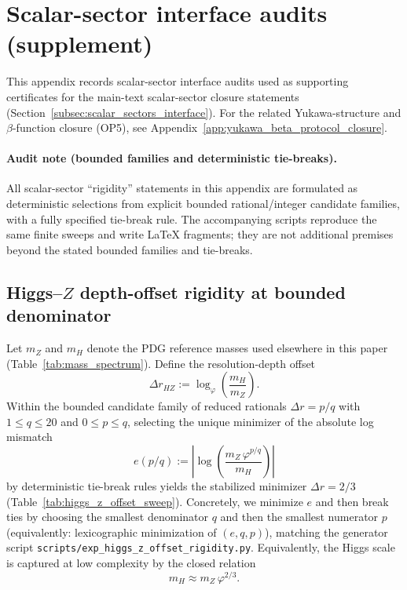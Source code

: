 \section{Scalar-sector interface audits (supplement)}
\label{app:scalar_interface_audits}

This appendix records scalar-sector interface audits used as supporting certificates for the main-text scalar-sector closure statements (Section~\ref{subsec:scalar_sectors_interface}).
For the related Yukawa-structure and $\beta$-function closure (OP5), see Appendix~\ref{app:yukawa_beta_protocol_closure}.

\paragraph{Audit note (bounded families and deterministic tie-breaks).}
All scalar-sector ``rigidity'' statements in this appendix are formulated as deterministic selections from explicit bounded rational/integer candidate families, with a fully specified tie-break rule.
The accompanying scripts reproduce the same finite sweeps and write \LaTeX{} fragments; they are not additional premises beyond the stated bounded families and tie-breaks.

\subsection{Higgs--\texorpdfstring{$Z$}{Z} depth-offset rigidity at bounded denominator}

\begin{proposition}\label{prop:higgs_z_offset_rigidity}
Let $m_Z$ and $m_H$ denote the PDG reference masses used elsewhere in this paper (Table~\ref{tab:mass_spectrum}).
Define the resolution-depth offset
\[
\Delta r_{HZ}:=\log_\varphi\!\left(\frac{m_H}{m_Z}\right).
\]
Within the bounded candidate family of reduced rationals $\Delta r=p/q$ with $1\le q\le 20$ and $0\le p\le q$, selecting the unique minimizer of the absolute log mismatch
\[
e(p/q):=\left|\log\!\left(\frac{m_Z\,\varphi^{p/q}}{m_H}\right)\right|
\]
by deterministic tie-break rules yields the stabilized minimizer $\Delta r=2/3$ (Table~\ref{tab:higgs_z_offset_sweep}).
Concretely, we minimize $e$ and then break ties by choosing the smallest denominator $q$ and then the smallest numerator $p$ (equivalently: lexicographic minimization of $(e,q,p)$), matching the generator script \texttt{scripts/exp\_higgs\_z\_offset\_rigidity.py}.
Equivalently, the Higgs scale is captured at low complexity by the closed relation
\[
m_H\approx m_Z\,\varphi^{2/3}.
\]
\end{proposition}


